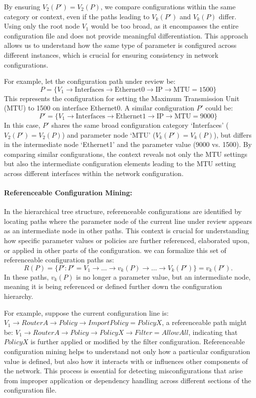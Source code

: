 By ensuring \(V_2(P') = V_2(P)\), we compare configurations within the same category or context, even if the paths leading to \( V_k(P') \) and \( V_k(P) \) differ. Using only the root node \( V_1 \) would be too broad, as it encompasses the entire configuration file and does not provide meaningful differentiation. This approach allows us to understand how the same type of parameter is configured across different instances, which is crucial for ensuring consistency in network configurations.



For example, let the configuration path under review be:
\[
P = \{ V_1 \rightarrow \text{Interfaces} \rightarrow \text{Ethernet0} \rightarrow \text{IP} \rightarrow \text{MTU} = 1500 \}
\]
This represents the configuration for setting the Maximum Transmission Unit (MTU) to 1500 on interface Ethernet0.
A similar configuration \( P' \) could be:
\[
P' = \{ V_1 \rightarrow \text{Interfaces} \rightarrow \text{Ethernet1} \rightarrow \text{IP} \rightarrow \text{MTU} = 9000 \}
\]
In this case, \( P' \) shares the same broad configuration category `Interfaces' (\( V_2(P') = V_2(P) \)) and parameter node `MTU' (\( V_k(P') = V_k(P) \)), but differs in the intermediate node `Ethernet1' and the parameter value (9000 vs. 1500). By comparing similar configurations, the context reveals not only the MTU settings but also the intermediate configuration elements leading to the MTU setting across different interfaces within the network configuration.


\paragraph{Referenceable Configuration Mining:} In the hierarchical tree structure, referenceable configurations are identified by locating paths where the parameter node of the current line under review appears as an intermediate node in other paths. This context is crucial for understanding how specific parameter values or policies are further referenced, elaborated upon, or applied in other parts of the configuration. we can formalize this set of referenceable configuration paths as:
\[
R(P) = \{ P' : P' =  V_1 \rightarrow \dots \rightarrow v_k(P) \rightarrow \dots \rightarrow V_k(P') \} = v_k(P').
\]
In these paths, \( v_k(P) \) is no longer a parameter value, but an intermediate node, meaning it is being referenced or defined further down the configuration hierarchy.

For example, suppose the current configuration line is:
\(V_1 \rightarrow RouterA \rightarrow Policy \rightarrow ImportPolicy = PolicyX\), a referenceable path might be:
\(
V_1 \rightarrow  RouterA \rightarrow Policy \rightarrow PolicyX \rightarrow Filter = AllowAll
\),
indicating that \( PolicyX \) is further applied or modified by the filter configuration. Referenceable configuration mining helps to understand not only how a particular configuration value is defined, but also how it interacts with or influences other components of the network. This process is essential for detecting misconfigurations that arise from improper application or dependency handling across different sections of the configuration file.


